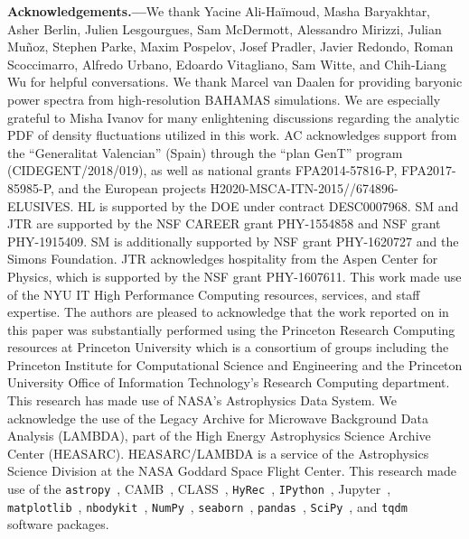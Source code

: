 \documentclass[prd,aps,10pt,nofootinbib,twocolumn,superscriptaddress,preprintnumbers,balancelastpage,longbibliography]{revtex4-1}
\begin{document}
\vspace{.3cm}

\noindent
{\bf Acknowledgements.---}We thank Yacine Ali-Ha\"{i}moud, Masha Baryakhtar, Asher Berlin, Julien Lesgourgues, Sam McDermott, Alessandro Mirizzi, Julian Mu\~{n}oz, Stephen Parke, Maxim Pospelov, Josef Pradler, Javier Redondo, Roman Scoccimarro, Alfredo Urbano, Edoardo Vitagliano, Sam Witte, and Chih-Liang Wu for helpful conversations. We thank Marcel van Daalen for providing baryonic power spectra from high-resolution BAHAMAS simulations. We are especially grateful to Misha Ivanov for many enlightening discussions regarding the analytic PDF of density fluctuations utilized in this work. AC acknowledges support from the ``Generalitat Valencian'' (Spain) through the ``plan GenT'' program (CIDEGENT/2018/019), as well as national grants FPA2014-57816-P, FPA2017-85985-P, and the European projects H2020-MSCA-ITN-2015//674896-ELUSIVES. HL is supported by the DOE under contract DESC0007968. SM and JTR are supported by the NSF CAREER grant PHY-1554858 and NSF grant PHY-1915409. SM is additionally supported by NSF grant PHY-1620727 and the Simons Foundation. 
JTR acknowledges hospitality from  the Aspen Center for Physics, which is supported by the NSF grant PHY-1607611.
This work made use of the NYU IT High Performance Computing resources, services, and staff expertise. The authors are pleased to acknowledge that the work reported on in this paper was substantially performed using the Princeton Research Computing resources at Princeton University which is a consortium of groups including the Princeton Institute for Computational Science and Engineering and the Princeton University Office of Information Technology's Research Computing department. This research has made use of NASA's Astrophysics Data System. We acknowledge the use of the Legacy Archive for Microwave Background Data Analysis (LAMBDA), part of the High Energy Astrophysics Science Archive Center (HEASARC). HEASARC/LAMBDA is a service of the Astrophysics Science Division at the NASA Goddard Space Flight Center. This research made use of the \texttt{astropy}~\cite{Price-Whelan:2018hus,Robitaille:2013mpa}, CAMB~\cite{Lewis:1999bs,Lewis:2002ah}, CLASS~\cite{Blas:2011rf}, \texttt{HyRec}~\cite{AliHaimoud:2010dx}, \texttt{IPython}~\cite{PER-GRA:2007}, Jupyter~\cite{Kluyver2016JupyterN}, \texttt{matplotlib}~\cite{Hunter:2007}, \texttt{nbodykit}~\cite{Hand:2017pqn}, \texttt{NumPy}~\cite{numpy:2011}, \texttt{seaborn}~\cite{seaborn}, \texttt{pandas}~\cite{pandas:2010}, \texttt{SciPy}~\cite{2020SciPy-NMeth}, and \texttt{tqdm}~\cite{da2019tqdm}  software packages.  
\end{document}
